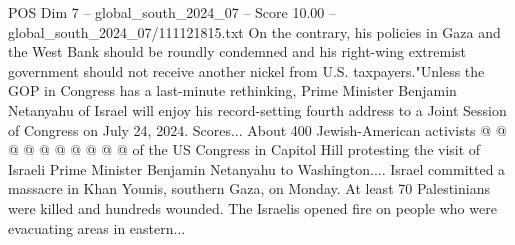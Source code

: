 \begin{textsample}{POS Dim 7 – global\_south\_2024\_07 – Score 10.00 – global\_south\_2024\_07/111121815.txt}
On the contrary, his policies in Gaza and the West Bank should be roundly condemned and his right-wing extremist government should not receive another nickel from U.S. taxpayers."Unless the GOP in Congress has a last-minute rethinking, Prime Minister Benjamin Netanyahu of Israel will enjoy his record-setting fourth address to a Joint Session of Congress on July 24, 2024.
Scores...
About 400 Jewish-American activists @ @ @ @ @ @ @ @ @ @ of the US Congress in Capitol Hill protesting the visit of Israeli Prime Minister Benjamin Netanyahu to Washington....
Israel committed a massacre in Khan Younis, southern Gaza, on Monday.
At least 70 Palestinians were killed and hundreds wounded.
The Israelis opened fire on people who were evacuating areas in eastern...

\end{textsample}
